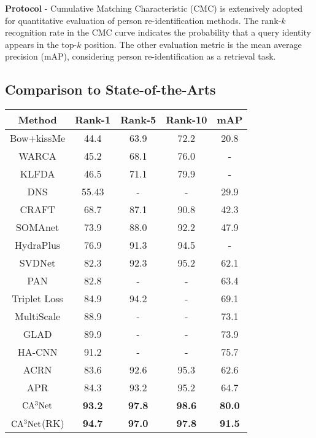 \documentclass[sigconf]{acmart}
\begin{document}
\textbf{Protocol} - Cumulative Matching Characteristic (CMC) is extensively adopted for quantitative evaluation of person re-identification methods. The rank-$k$ recognition rate in the CMC curve indicates the probability that a query identity appears in the top-$k$ position. The other evaluation metric is the mean average precision (mAP), considering person re-identification as a retrieval task.

\subsection{Comparison to State-of-the-Arts}\begin{table}[htbp]
	\begin{center}
		\newcommand{\tabincell}[2]{\begin{tabular}{@{}#1@{}}#2\end{tabular}}
		\begin{tabular}{|c|c|c|c|c|}
			\hline
			\textbf{Method}&\textbf{Rank-1}&\textbf{Rank-5}&\textbf{Rank-10}&\textbf{mAP}\\
			\hline
			Bow+kissMe\cite{17}&44.4&63.9&72.2&20.8\\
			\hline
			WARCA\cite{24}&45.2&68.1&76.0&-\\
			\hline
			KLFDA\cite{23}&46.5&71.1&79.9&-\\
			\hline
			DNS\cite{22}&55.43&-&-&29.9\\
			\hline
			CRAFT\cite{21}&68.7&87.1&90.8&42.3\\
			\hline
			\hline
			SOMAnet\cite{25}&73.9&88.0&92.2&47.9\\
			\hline
			HydraPlus\cite{27}&76.9&91.3&94.5&-\\
			\hline
			SVDNet\cite{26}&82.3&92.3&95.2&62.1\\
			\hline
			PAN\cite{28}&82.8&-&-&63.4\\
			\hline
			Triplet Loss\cite{29}&84.9&94.2&-&69.1\\
			\hline
			MultiScale \cite{30}&88.9&-&-&73.1\\
			\hline
			GLAD \cite{31}&89.9&-&-&73.9\\
			\hline
			HA-CNN\cite{7}&91.2&-&-&75.7\\
			\hline
			\hline
			ACRN \cite{11}&83.6&92.6&95.3&62.6\\
			\hline
			APR\cite{12}&84.3&93.2&95.2&64.7\\
			\hline
			\hline
			$\rm CA^3Net$&\textbf{93.2}&\textbf{97.8}&\textbf{98.6}&\textbf{80.0}\\
			\hline $\rm CA^3Net$(RK)&\textbf{94.7}&\textbf{97.0}&\textbf{97.8}&\textbf{91.5}\\

\end{tabular}
\end{center}
\end{table}
\end{document}
